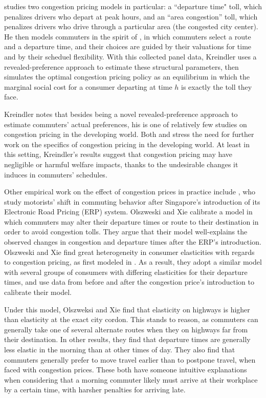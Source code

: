 \documentclass[JEL]{AEA}
\begin{document}
\cite{kreindler-2018} studies two congestion pricing models in particular: a ``departure time" toll, which penalizes drivers who depart at peak hours, and an ``area congestion'' toll, which penalizes drivers who drive through a particular area (the congested city center). He then models commuters in the spirit of \cite{arnott-1994}, in which commuters select a route and a departure time, and their choices are guided by their valuations for time and by their scheduel flexibility. With this collected panel data, Kreindler uses a revealed-preference approach to estimate these structural parameters, then simulates the optimal congestion pricing policy as an equilibrium in which the marginal social cost for a consumer departing at time $h$ is exactly the toll they face.

Kreindler notes that besides being a novel revealed-preference approach to estimate commuters' actual preferences, his is one of relatively few studies on congestion pricing in the developing world. Both \cite{kreindler-2018} and \cite{bryan-2020} stress the need for further work on the specifics of congestion pricing in the developing world. At least in this setting, Kreindler's results suggest that congestion pricing may have negligible or harmful welfare impacts, thanks to the undesirable changes it induces in commuters' schedules.

Other empirical work on the effect of congestion prices in practice include \cite{olszweski-2005}, who study motorists' shift in commuting behavior after Singapore's introduction of its Electronic Road Pricing (ERP) system. Olszweski and Xie calibrate a model in which commuters may alter their departure times or route to their destination in order to avoid congestion tolls. They argue that their model well-explains the observed changes in congestion and departure times after the ERP's introduction. Olszweski and Xie find great heterogeneity in consumer elasticities with regards to congestion pricing, as first modeled in \cite{arnott-1994}. As a result, they adopt a similar model with several groups of consumers with differing elasticities for their departure times, and use data from before and after the congestion price's introduction to calibrate their model.

Under this model, Olszweksi and Xie find that elasticity on highways is higher than elasticity at the exact city cordon. This stands to reason, as commuters can generally take one of several alternate routes when they on highways far from their destination. In other results, they find that departure times are generally less elastic in the morning than at other times of day. They also find that commuters generally prefer to move travel earlier than to postpone travel, when faced with congestion prices. These both have someone intuitive explanations when considering that a morning commuter likely must arrive at their workplace by a certain time, with harsher penalties for arriving late.
\end{document}

